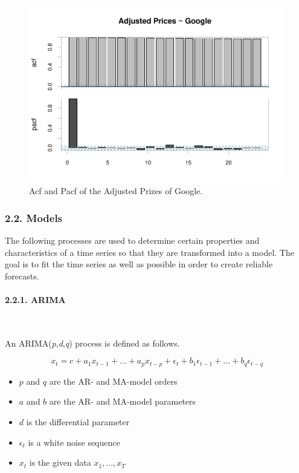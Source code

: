 \documentclass[
]{article}
\providecommand{\tightlist}{%
  \setlength{\itemsep}{0pt}\setlength{\parskip}{0pt}}
\begin{document}
\begin{figure}

{\centering \includegraphics[width=0.7\linewidth]{00_main_files/figure-latex/chap2.1.2-1} 

}

\caption{Acf and Pacf of the Adjusted Prizes of Google.}\label{fig:chap2.1.2}
\end{figure}

\newpage

\hypertarget{models-section}{%
\subsubsection{2.2. Models}\label{models-section}}

The following processes are used to determine certain properties and
characteristics of a time series so that they are transformed into a
model. The goal is to fit the time series as well as possible in order
to create reliable forecasts.

\hypertarget{arima}{%
\paragraph{2.2.1. ARIMA}\label{arima}}

~

An ARIMA(\emph{p},\emph{d},\emph{q}) process is defined as follows.

\begin{equation} \label{eq:arima}
  x_{t}=c+a_{1}x_{t-1}+...+a_{p}x_{t-p}+\epsilon_{t}+b_{1}\epsilon_{t-1}+...+b_{q}\epsilon_{t-q}
\end{equation}

\begin{itemize}
\tightlist
\item
  \(p\) and \(q\) are the AR- and MA-model orders
\item
  \(a\) and \(b\) are the AR- and MA-model parameters
\item
  \(d\) is the differential parameter
\item
  \(\epsilon_t\) is a white noise sequence
\item
  \(x_t\) is the given data \(x_{1},...,x_{T}\)
\end{itemize}
\end{document}
